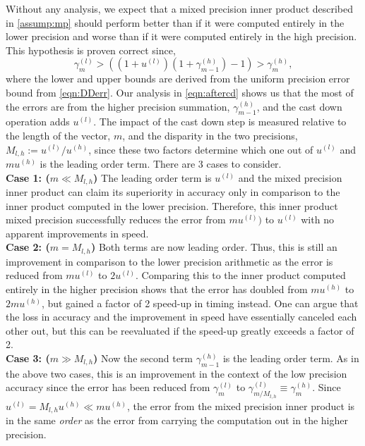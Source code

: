 Without any analysis, we expect that a mixed precision inner product described in \cref{assump:mp} should perform better than if it were computed entirely in the lower precision and worse than if it were computed entirely in the high precision.
This hypothesis is proven correct since,
\[\gamma_m^{(l)}>((1+u^{(l)})(1+\gamma_{m-1}^{(h)})-1)>
\gamma_{m}^{(h)},\]
where the lower and upper bounds are derived from the uniform precision error bound from \cref{eqn:DDerr}. 
Our analysis in \cref{eqn:aftercd} shows us that the most of the errors are from the higher precision summation, $\gamma_{m-1}^{(h)}$, and the cast down operation adds $u^{(l)}$.
The impact of the cast down step is measured relative to the length of the vector, $m$, and the disparity in the two precisions, $M_{l,h}:=u^{(l)}/u^{(h)}$, since these two factors determine which one out of $u^{(l)}$ and $mu^{(h)}$ is the leading order term. 
There are 3 cases to consider. \\
\textbf{Case 1: ($m\ll M_{l,h}$)} The leading order term is $u^{(l)}$ and the mixed precision inner product can claim its superiority in accuracy only in comparison to the inner product computed in the lower precision. 
Therefore, this inner product mixed precision successfully reduces the error from $mu^{(l)})$ to $u^{(l)}$ with no apparent improvements in speed.\\
\textbf{Case 2: ($m = M_{l,h}$)}
Both terms are now leading order. 
Thus, this is still an improvement in comparison to the lower precision arithmetic as the error is reduced from $mu^{(l)}$ to $2u^{(l)}$.
Comparing this to the inner product computed entirely in the higher precision shows that the error has doubled from $mu^{(h)}$ to $2mu^{(h)}$, but gained a factor of 2 speed-up in timing instead. 
One can argue that the loss in accuracy and the improvement in speed have essentially canceled each other out, but this can be reevaluated if the speed-up greatly exceeds a factor of 2. \\
\textbf{Case 3: ($m \gg M_{l,h}$)}
Now the second term $\gamma_{m-1}^{(h)}$ is the leading order term. 
As in the above two cases, this is an improvement in the context of the low precision accuracy since the error has been reduced from $\gamma_m^{(l)}$ to $\gamma_{m/M_{l,h}}^{(l)}\equiv \gamma_m^{(h)}$. 
Since $u^{(l)} = M_{l,h}u^{(h)} \ll mu^{(h)}$, the error from the mixed precision inner product is in the same \emph{order} as the error from carrying the computation out in the higher precision. 

